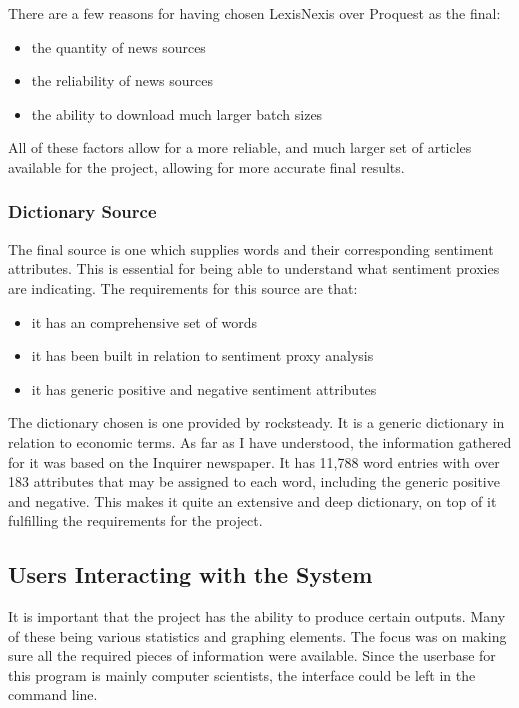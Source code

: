 There are a few reasons for having chosen LexisNexis over Proquest as the final:
\begin{itemize}
    \item the quantity of news sources
    \item the reliability of news sources
    \item the ability to download much larger batch sizes
\end{itemize}
All of these factors allow for a more reliable, and much larger set of articles available for the project, allowing for more accurate final results.

\subsubsection{Dictionary Source}

The final source is one which supplies words and their corresponding sentiment attributes. This is essential for being able to understand what sentiment proxies are indicating. The requirements for this source are that:
\begin{itemize}
    \item it has an comprehensive set of words
    \item it has been built in relation to sentiment proxy analysis
    \item it has generic positive and negative sentiment attributes
\end{itemize}
The dictionary chosen is one provided by rocksteady. It is a generic dictionary in relation to economic terms. As far as I have understood, the information gathered for it was based on the Inquirer newspaper. It has 11,788 word entries with over 183 attributes that may be assigned to each word, including the generic positive and negative. This makes it quite an extensive and deep dictionary, on top of it fulfilling the requirements for the project.

\subsection{Users Interacting with the System}

It is important that the project has the ability to produce certain outputs. Many of these being various statistics and graphing elements. The focus was on making sure all the required pieces of information were available. Since the userbase for this program is mainly computer scientists, the interface could be left in the command line.


